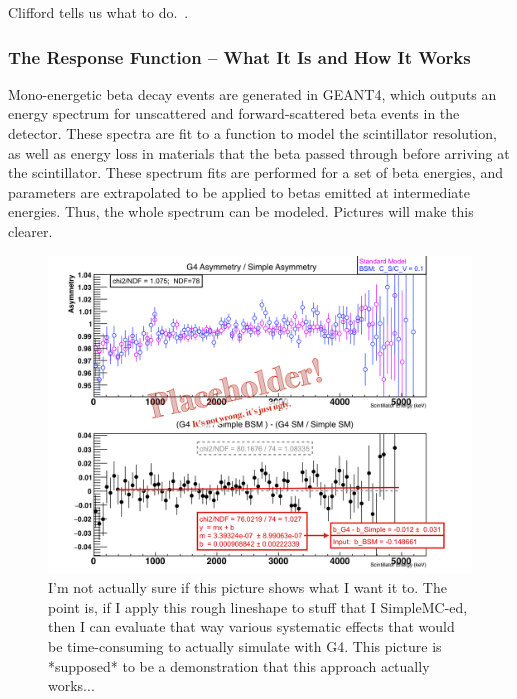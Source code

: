 Clifford tells us what to do.~\cite{clifford}.
	
\subsubsection{The Response Function -- What It Is and How It Works}
Mono-energetic beta decay events are generated in GEANT4, which outputs an energy spectrum for unscattered and forward-scattered beta events in the detector.  These spectra are fit to a function to model the scintillator resolution, as well as energy loss in materials that the beta passed through before arriving at the scintillator.  These spectrum fits are performed for a set of beta energies, and parameters are extrapolated to be applied to betas emitted at intermediate energies.  Thus, the whole spectrum can be modeled.  Pictures will make this clearer. 
	
\begin{figure}[h!!!t]
	\centering
	\includegraphics[width=.999\linewidth]
	{Figures/LineshapeDemo_prelim.png}
	\caption[Lineshape Comparison]{I'm not actually sure if this picture shows what I want it to.  The point is, if I apply this rough lineshape to stuff that I SimpleMC-ed, then I can evaluate that way various systematic effects that would be time-consuming to actually simulate with G4.  This picture is  *supposed* to be a demonstration that this approach actually works... }    	
	\label{fig:lineshape_demo}
\end{figure}
	
